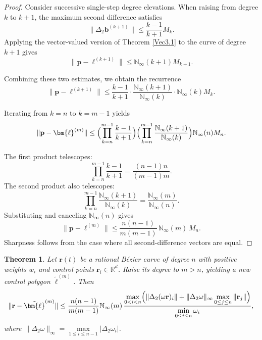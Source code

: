 \documentclass[preprint,12pt]{elsarticle}
\newtheorem{Theorem}{Theorem}
\begin{document}
\begin{proof}
  Consider successive single-step degree elevations. When raising from degree $k$ to $k+1$, the maximum second difference satisfies\cite{Nairn1999}
  \[
  \|\Delta_2\mathbf{b}^{(k+1)}\|\le\frac{k-1}{k+1}M_k.
  \]
    Applying the vector-valued version of Theorem \ref{Vec3.1}  to the curve of degree $k+1$ gives
  \[
  \|\mathbf{p}-\bm{\ell}^{(k+1)}\|\le\mathbb{N}_{\infty}(k+1)M_{k+1}.
  \]

  Combining these two estimates, we obtain the recurrence
  \[
  \|\mathbf{p}-\bm{\ell}^{(k+1)}\|\le\frac{k-1}{k+1}\cdot\frac{\mathbb{N}_{\infty}(k+1)}{\mathbb{N}_{\infty}(k)}\cdot\mathbb{N}_{\infty}(k)M_k.
  \]

  Iterating from $k=n$ to $k=m-1$ yields
  \[
  \|\mathbf{p}-\bm{\ell}^{(m)}\|\le
  \Bigl(\prod_{k=n}^{m-1}\frac{k-1}{k+1}\Bigr)
  \Bigl(\prod_{k=n}^{m-1}\frac{\mathbb{N}_{\infty}(k+1)}{\mathbb{N}_{\infty}(k)}\Bigr)
  \mathbb{N}_{\infty}(n)M_n.
  \]

  The first product telescopes:
  \[
  \prod_{k=n}^{m-1}\frac{k-1}{k+1}=\frac{(n-1)n}{(m-1)m}.
  \]
  The second product also telescopes:
  \[
  \prod_{k=n}^{m-1}\frac{\mathbb{N}_{\infty}(k+1)}{\mathbb{N}_{\infty}(k)}=\frac{\mathbb{N}_{\infty}(m)}{\mathbb{N}_{\infty}(n)}.
  \]
  Substituting and canceling $\mathbb{N}_{\infty}(n)$ gives
  \[
  \|\mathbf{p}-\bm{\ell}^{(m)}\|\le\frac{n(n-1)}{m(m-1)}\,\mathbb{N}_{\infty}(m)\,M_n.
  \]
  Sharpness follows from the case where all second-difference vectors are equal.
\end{proof}

\begin{Theorem}
  Let $\mathbf{r}(t)$ be a rational B\'ezier curve of degree $n$ with positive weights $w_i$ and control points $\mathbf{r}_i\in\mathbb{R}^d$. Raise its degree to $m>n$, yielding a new control polygon $\tilde{\bm{\ell}}^{(m)}$. Then
  \[
  \|\mathbf{r}-\tilde{\bm{\ell}}^{(m)}\|\le\frac{n(n-1)}{m(m-1)}\mathbb{N}_{\infty}(m)\,
  \frac{\displaystyle\max_{0<i<n}\Bigl(\|\Delta_2(\omega\mathbf{r})_i\|+\|\Delta_2 \omega\|_\infty\max_{0 \le j \le n}\|\mathbf{r}_j\|\Bigr)}{\displaystyle\min_{0\le i\le n}\omega_i},
  \]
  where  $\|\Delta_2 \omega\|_\infty=\max\limits_{1\le i\le n-1}|\Delta_2 \omega_i|$.
\end{Theorem}
\end{document}
